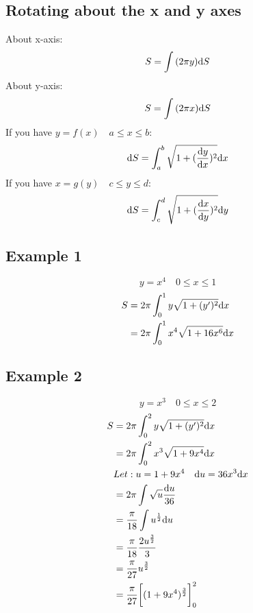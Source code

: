 \documentclass[letterpaper, 12pt]{math}
\begin{document}
\subsection*{Rotating about the x and y axes}
About x-axis:
\[ S = \int{(2\pi y)\mathrm{d}{S}} \]
About y-axis:
\[ S = \int{(2\pi x)\mathrm{d}{S}} \]
If you have \( y = f(x) \quad a \leq x \leq b \):
\[ \mathrm{d}{S} = \int_{a}^{b}{\sqrt{1+(\frac{\mathrm{d}{y}}{\mathrm{d}{x}})^{2}}\mathrm{d}{x}} \]
If you have \( x = g(y) \quad c \leq y \leq d \):
\[ \mathrm{d}{S} = \int_{c}^{d}{\sqrt{1+(\frac{\mathrm{d}{x}}{\mathrm{d}{y}})^{2}}\mathrm{d}{y}} \]

\subsection*{Example 1}
\[ y = x^{4} \quad 0 \leq x \leq 1 \]
\begin{align*}
  S &= 2\pi\int_{0}^{1}{y\sqrt{1+(y')^{2}}\mathrm{d}{x}} \\
  &= 2\pi\int_{0}^{1}{x^{4}\sqrt{1+16x^{6}}\mathrm{d}{x}}
\end{align*}

\subsection*{Example 2}
\[ y = x^{3} \quad 0 \leq x \leq 2 \]
\begin{align*}
  S &= 2\pi\int_{0}^{2}{y\sqrt{1+(y')^{2}}\mathrm{d}{x}} \\
  &= 2\pi\int_{0}^{2}{x^{3}\sqrt{1+9x^{4}}\mathrm{d}{x}} \\
  & Let: u = 1+9x^{4} \quad \mathrm{d}{u} = 36x^{3}\mathrm{d}{x} \\
  &= 2\pi\int{\sqrt{u}\frac{\mathrm{d}{u}}{36}} \\
  &= \frac{\pi}{18}\int{u^{\frac{1}{2}}\mathrm{d}{u}} \\
  &= \frac{\pi}{18}\frac{2u^{\frac{3}{2}}}{3} \\
  &= \frac{\pi}{27}u^{\frac{3}{2}} \\
  &= \frac{\pi}{27}\bigg[(1+9x^{4})^{\frac{3}{2}}\bigg]_{0}^{2}
\end{align*}
\end{document}
